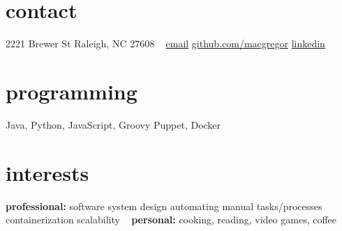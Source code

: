 
\begin{aside} %
\section{contact}
2221 Brewer St
Raleigh, NC 27608
~
\href{mailto:matthew.m.stratton@gmail.com}{email}
\href{https://github.com/macgregor}{github.com/macgregor}
\href{https://www.linkedin.com/in/matthew-stratton-b910964b}{linkedin}
\section{programming}
Java, Python, JavaScript, Groovy
Puppet, Docker
\section{interests}
\textbf{professional:}
software system design
automating manual tasks/processes
containerization
scalability
~
\textbf{personal:} cooking, reading, video games, coffee
\end{aside}
